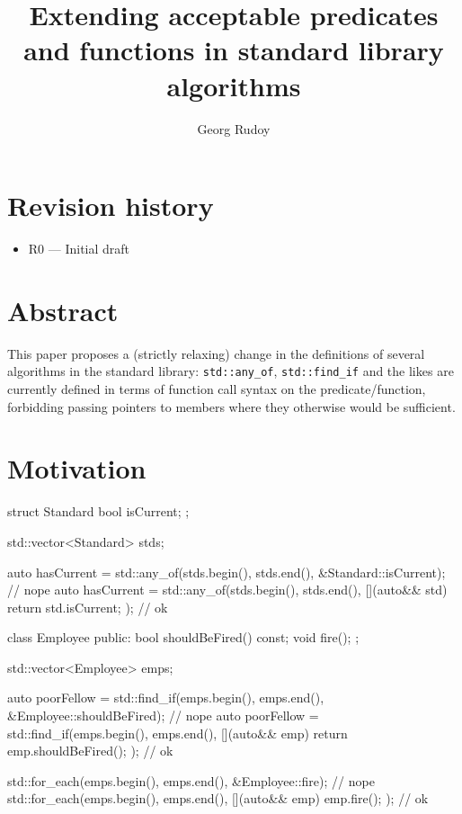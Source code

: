 \documentclass{wg21}
\title{Extending acceptable predicates and functions in standard library algorithms}
\author{Georg Rudoy}{georgii.rudoi@phystech.edu}
\newcommand{\cc}[1]{\texttt{#1}}
\begin{document}
\maketitle

\section{Revision history}
\begin{itemize}
  \item R0 --- Initial draft
\end{itemize}

\section{Abstract}

This paper proposes a (strictly relaxing) change in the definitions of several
algorithms in the standard library: \cc{std::any_of}, \cc{std::find_if} and the
likes are currently defined in terms of function call syntax on the predicate/function,
forbidding passing pointers to members where they otherwise would be sufficient.

\section{Motivation}

\begin{cpp}
  struct Standard
  {
      bool isCurrent;
  };

  std::vector<Standard> stds;

  auto hasCurrent = std::any_of(stds.begin(), stds.end(),
          &Standard::isCurrent);                                // nope
  auto hasCurrent = std::any_of(stds.begin(), stds.end(),
          [](auto&& std) { return std.isCurrent; });            // ok 
\end{cpp}

\begin{cpp}
  class Employee
  {
  public:
      bool shouldBeFired() const;
      void fire();
  };

  std::vector<Employee> emps;

  auto poorFellow = std::find_if(emps.begin(), emps.end(),
          &Employee::shouldBeFired);                            // nope
  auto poorFellow = std::find_if(emps.begin(), emps.end(),
          [](auto&& emp) { return emp.shouldBeFired(); });      // ok

  std::for_each(emps.begin(), emps.end(), &Employee::fire);     // nope
  std::for_each(emps.begin(), emps.end(),
          [](auto&& emp) { emp.fire(); });                      // ok
\end{cpp}
\end{document}
